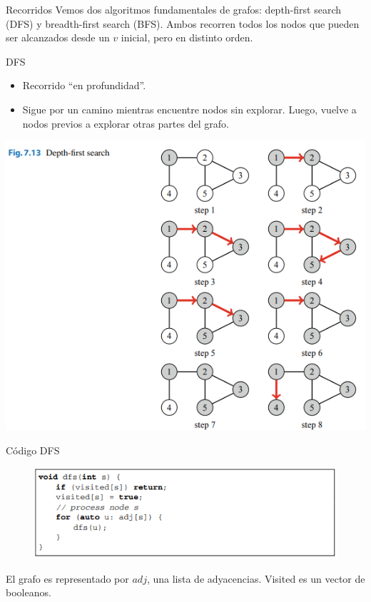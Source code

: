 \documentclass{beamer}
\begin{document}
\begin{frame}{Recorridos}
	Vemos dos algoritmos fundamentales de grafos: depth-first search (DFS) y breadth-first search (BFS). Ambos recorren todos los nodos que pueden ser alcanzados desde un $v$ inicial, pero en distinto orden.
\end{frame}

\begin{frame}{DFS}
	\begin{itemize}
		\item Recorrido ``en profundidad''.
		\item Sigue por un camino mientras encuentre nodos sin explorar. Luego, vuelve a nodos previos a explorar otras partes del grafo.
	\end{itemize}
	
	\centering
	\includegraphics[scale=0.6]{figuras/dfs_ejecucion.PNG}
\end{frame}

\begin{frame}{Código DFS}
	\begin{figure}
		\centering
		\includegraphics[]{figuras/dfs.PNG}
	\end{figure}
	
	El grafo es representado por $adj$, una lista de adyacencias. Visited es un vector de booleanos.
	
\end{frame}
\end{document}
